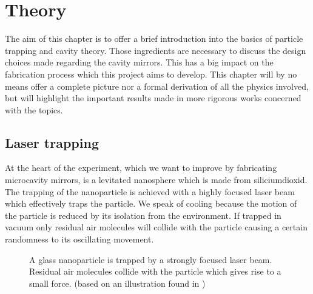 \chapter{Theory}
The aim of this chapter is to offer a brief introduction into the basics of particle trapping and cavity theory. Those ingredients are necessary to discuss the design choices made regarding the cavity mirrors. This has a big impact on the fabrication process which this project aims to develop. This chapter will by no means offer a complete picture nor a formal derivation of all the physics involved, but will highlight the important results made in more rigorous works concerned with the topics.

\section{Laser trapping}\label{ChapLaserTrapping}
At the heart of the experiment, which we want to improve by fabricating microcavity mirrors, is a levitated nanosphere which is made from siliciumdioxid. The trapping of the nanoparticle is achieved with a highly focused laser beam which effectively traps the particle. We speak of cooling because the motion of the particle is reduced by its isolation from the environment. If trapped in vacuum only residual air molecules will collide with the particle causing a certain randomness to its oscillating movement.

\begin{figure}[H]
	
	\caption{A glass nanoparticle is trapped by a strongly focused laser beam. Residual air molecules collide with the particle which gives rise to a small force. (based on an illustration found in \cite{gieseler2013thermal})}
\end{figure}

